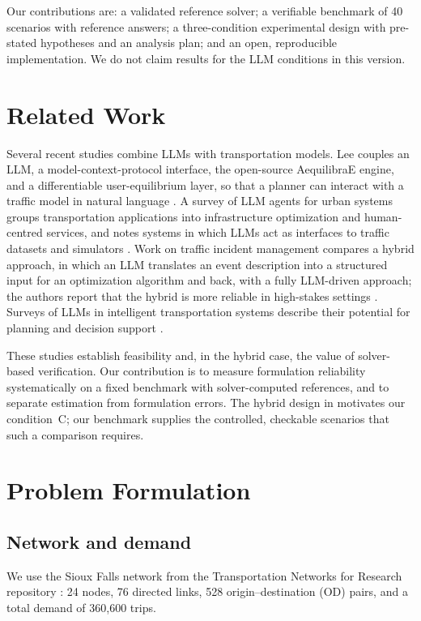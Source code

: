 \documentclass[11pt,a4paper]{article}
\begin{document}
Our contributions are: a validated reference solver; a verifiable benchmark of 40 scenarios with reference answers; a three-condition experimental design with pre-stated hypotheses and an analysis plan; and an open, reproducible implementation. We do not claim results for the LLM conditions in this version.

\section{Related Work}
Several recent studies combine LLMs with transportation models. Lee couples an LLM, a model-context-protocol interface, the open-source AequilibraE engine, and a differentiable user-equilibrium layer, so that a planner can interact with a traffic model in natural language \cite{lee2026}. A survey of LLM agents for urban systems groups transportation applications into infrastructure optimization and human-centred services, and notes systems in which LLMs act as interfaces to traffic datasets and simulators \cite{urban2025}. Work on traffic incident management compares a hybrid approach, in which an LLM translates an event description into a structured input for an optimization algorithm and back, with a fully LLM-driven approach; the authors report that the hybrid is more reliable in high-stakes settings \cite{incident2025}. Surveys of LLMs in intelligent transportation systems describe their potential for planning and decision support \cite{its2025}.

These studies establish feasibility and, in the hybrid case, the value of solver-based verification. Our contribution is to measure formulation reliability systematically on a fixed benchmark with solver-computed references, and to separate estimation from formulation errors. The hybrid design in \cite{incident2025} motivates our condition~C; our benchmark supplies the controlled, checkable scenarios that such a comparison requires.

\section{Problem Formulation}
\subsection{Network and demand}
We use the Sioux Falls network from the Transportation Networks for Research repository \cite{tntp}: 24 nodes, 76 directed links, 528 origin--destination (OD) pairs, and a total demand of 360{,}600 trips.
\end{document}
